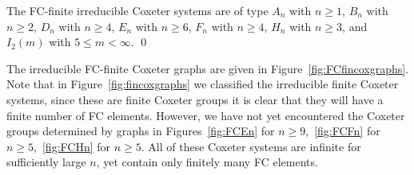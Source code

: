 \begin{theorem}
\label{thm:FCfinite} The FC-finite irreducible Coxeter systems are of type $A_n$ with $n \geq 1$, $B_n$ with $n \geq 2$, $D_n$ with $n \geq 4$, $E_n$ with $n \geq 6$, $F_n$ with $n \geq 4$, $H_n$ with $n \geq 3$, and $I_2(m)$ with $5 \leq m < \infty$. \qed
\end{theorem} 
 
The irreducible FC-finite Coxeter graphs are given in Figure~\ref{fig:FCfincoxgraphs}. Note that in Figure~\ref{fig:fincoxgraphs} we classified the irreducible finite Coxeter systems, since these are finite Coxeter groups it is clear that they will have a finite number of FC elements. However, we have not yet encountered the Coxeter groups determined by graphs in Figures~\ref{fig:FCEn} for $n \geq 9$,~\ref{fig:FCFn} for $n \geq 5$,~\ref{fig:FCHn} for $n \geq 5$. All of these Coxeter systems are infinite for sufficiently large $n$, yet contain only finitely many FC elements.

